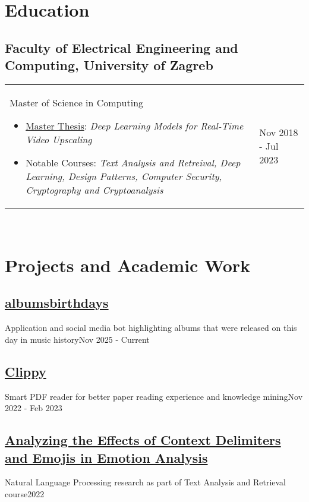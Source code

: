 \documentclass[a4paper]{article}
\makeatletter
\newlength{\tablewidth}
\newenvironment{period}[2]{%
\newcommand{\sarma}{#2}%
\setlength{\tablewidth}{\linewidth}
\addtolength{\tablewidth}{-2\tabcolsep}
\begin{tabular}{@{}p{0.8\tablewidth}>{\raggedleft\arraybackslash}p{0.2\tablewidth}@{}}%
#1 \newline
\begin{itemize}
}{%
\end{itemize} & \sarma \\%
\end{tabular}\\
}
\newenvironment{blank-period}[2]{%
\newcommand{\sarma}{#2}%
\setlength{\tablewidth}{\linewidth}
\addtolength{\tablewidth}{-2\tabcolsep}
\begin{tabular}{@{}p{0.8\tablewidth}>{\raggedleft\arraybackslash}p{0.2\tablewidth}@{}}%
#1 \newline & \sarma \\%
\end{tabular}\\
}
\makeatother
\begin{document}
\section{Education}
\subsection{Faculty of Electrical Engineering and Computing, University of Zagreb}
\begin{period}{Master of Science in Computing}{Nov 2018 - Jul 2023}
	\item \href{http://www.zemris.fer.hr/predmeti/ra/Magisterij/23_Grgic/Final_0036516270_94.pdf}{Master Thesis}:
		\textit{Deep Learning Models for Real-Time Video Upscaling}
    \item {Notable Courses: \textit{Text Analysis and Retreival, Deep Learning, Design Patterns, Computer Security, Cryptography and Cryptoanalysis}}
\end{period}

\section{Projects and Academic Work}

\subsection{\href{https://albumsbirthdays.djeno.xyz/}{albumsbirthdays}}
\begin{blank-period}{Application and social media bot highlighting albums that were released on this day in music history}{Nov 2025 - Current}
\end{blank-period}

\subsection{\href{https://github.com/clippydsdone}{Clippy}}
\begin{blank-period}{Smart PDF reader for better paper reading experience and knowledge mining}{Nov 2022 - Feb 2023}
\end{blank-period}

\subsection{\href{https://github.com/dinogrgic1/fer-text-analysis-and-retrieval-labs/blob/6b9f0664b8d09dacfc775ba9c2d6ff19e66f3f32/SENTI_MENTI.pdf}{Analyzing the Effects of Context Delimiters and Emojis in Emotion Analysis}}
\begin{blank-period}{Natural
Language Processing research as part of Text Analysis and Retrieval course}{2022}
\end{blank-period}
\end{document}
